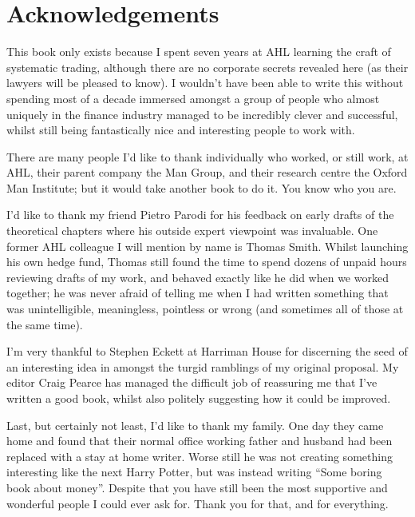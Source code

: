 \chapter*{Acknowledgements}  {} 

This book only exists because I spent seven years at AHL learning the craft of systematic trading, although there are no corporate secrets revealed here (as their lawyers will be pleased to know). I wouldn't have been able to write this without spending most of a decade immersed amongst a group of people who almost uniquely in the finance industry managed to be incredibly clever and successful, whilst still being fantastically nice and interesting people to work with.

There are many people I'd like to thank individually who worked, or still work, at AHL, their parent company the Man Group, and their research centre the Oxford Man Institute; but it would take another book to do it. You know who you are.

I'd like to thank my friend Pietro Parodi for his feedback on early drafts of the theoretical chapters where his outside expert viewpoint was invaluable. One former AHL colleague I will mention by name is Thomas Smith. Whilst launching his own hedge fund, Thomas still found the time to spend dozens of unpaid hours reviewing drafts of my work, and behaved exactly like he did when we worked together; he was never afraid of telling me when I had written something that was unintelligible, meaningless, pointless or wrong (and sometimes all of those at the same time).

I'm very thankful to Stephen Eckett at Harriman House for discerning the seed of an interesting idea in amongst the turgid ramblings of my original proposal. My editor Craig Pearce has managed the difficult job of reassuring me that I've written a good book, whilst also politely suggesting how it could be improved.

Last, but certainly not least, I'd like to thank my family. One day they came home and found that their normal office working father and husband had been replaced with a stay at home writer. Worse still he was not creating something interesting like the next Harry Potter, but was instead writing ``Some boring book about money''. Despite that you have still been the most supportive and wonderful people I could ever ask for. Thank you for that, and for everything.
